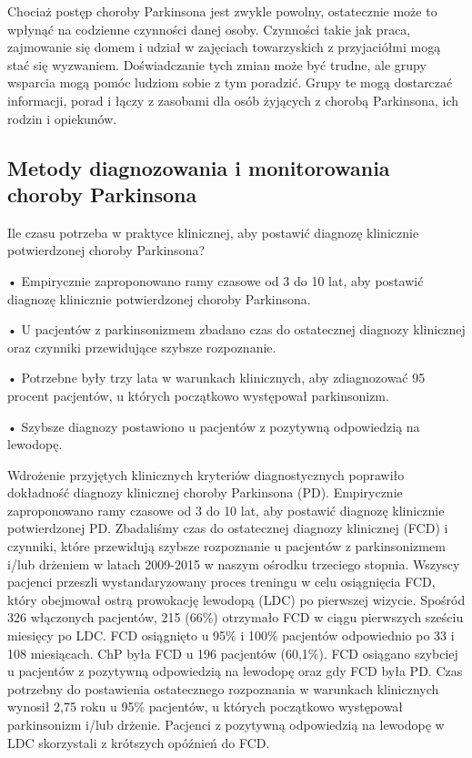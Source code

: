 Chociaż postęp choroby Parkinsona jest zwykle powolny, ostatecznie może to wpłynąć na codzienne czynności danej osoby. Czynności takie jak praca, zajmowanie się domem i udział w zajęciach towarzyskich z przyjaciółmi mogą stać się wyzwaniem. Doświadczanie tych zmian może być trudne, ale grupy wsparcia mogą pomóc ludziom sobie z tym poradzić. Grupy te mogą dostarczać informacji, porad i łączy z zasobami dla osób żyjących z chorobą Parkinsona, ich rodzin i opiekunów.


\subsection{Metody diagnozowania i monitorowania choroby Parkinsona}
\label{subsec:diagnostyka}

Ile czasu potrzeba w praktyce klinicznej, aby postawić diagnozę klinicznie potwierdzonej choroby Parkinsona?\cite{ROSSI202153}

• Empirycznie zaproponowano ramy czasowe od 3 do 10 lat, aby postawić diagnozę klinicznie potwierdzonej choroby Parkinsona.

• U pacjentów z parkinsonizmem zbadano czas do ostatecznej diagnozy klinicznej oraz czynniki przewidujące szybsze rozpoznanie.

• Potrzebne były trzy lata w warunkach klinicznych, aby zdiagnozować 95 procent pacjentów, u których początkowo występował parkinsonizm.

• Szybsze diagnozy postawiono u pacjentów z pozytywną odpowiedzią na lewodopę.

Wdrożenie przyjętych klinicznych kryteriów diagnostycznych poprawiło dokładność diagnozy klinicznej choroby Parkinsona (PD). Empirycznie zaproponowano ramy czasowe od 3 do 10 lat, aby postawić diagnozę klinicznie potwierdzonej PD.
Zbadaliśmy czas do ostatecznej diagnozy klinicznej (FCD) i czynniki, które przewidują szybsze rozpoznanie u pacjentów z
parkinsonizmem i/lub drżeniem w latach 2009-2015 w naszym ośrodku trzeciego stopnia.
Wszyscy pacjenci przeszli wystandaryzowany proces treningu w celu osiągnięcia FCD, który obejmował ostrą prowokację lewodopą (LDC) po pierwszej wizycie.
Spośród 326 włączonych pacjentów, 215 (66\%) otrzymało FCD w ciągu pierwszych sześciu miesięcy po LDC. FCD osiągnięto u 95\% i 100\% pacjentów odpowiednio po 33 i 108 miesiącach. ChP była FCD u 196 pacjentów (60,1\%). FCD osiągano szybciej u pacjentów z pozytywną odpowiedzią na lewodopę oraz gdy FCD była PD.
Czas potrzebny do postawienia ostatecznego rozpoznania w warunkach klinicznych wynosił 2,75 roku u 95\% pacjentów, u których
początkowo występował parkinsonizm i/lub drżenie. Pacjenci z pozytywną odpowiedzią na lewodopę w LDC skorzystali z krótszych opóźnień do FCD.


